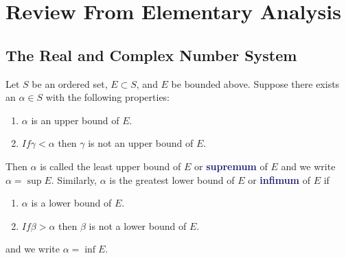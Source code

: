 \documentclass[11pt]{article}
\numberwithin{equation}{section}
\newcommand{\navy}[1]{\textcolor{MidnightBlue}{\bf #1}}
\theoremstyle{definition}
\theoremstyle{definition}
\newcommand{\1}{\mathbbm 1}
\begin{document}
\newpage

\appendix

\section{Review From Elementary Analysis}

\subsection{The Real and Complex Number System}

\begin{definition}
	Let $S$ be an ordered set, $E \subset S$, and $E$ be bounded above. Suppose there exists an $\alpha \in S$ with the following properties:
	\begin{enumerate}
		\item $\alpha$ is an upper bound of $E$.
		\item $If \gamma < \alpha$ then $\gamma$ is not an upper bound of $E$.
	\end{enumerate}
	Then $\alpha$ is called the least upper bound of $E$ or \navy{supremum} of $E$ and we write $\alpha = \sup E$. Similarly, $\alpha$ is the greatest lower bound of $E$ or \navy{infimum} of $E$ if 
	\begin{enumerate}
		\item $\alpha$ is a lower bound of $E$.
		\item $If \beta > \alpha$ then $\beta$ is not a lower bound of $E$.
	\end{enumerate}
	and we write $\alpha = \inf E$.
\end{definition}
\end{document}
